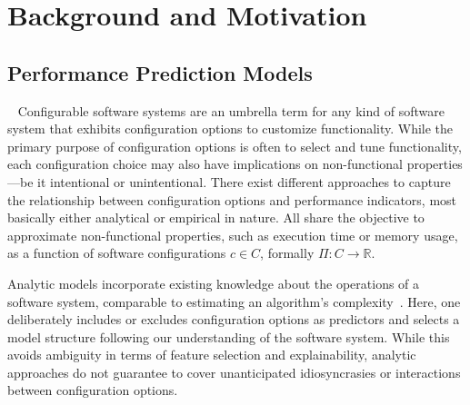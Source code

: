 \section{Background and Motivation}
\subsection{Performance Prediction Models}~\label{sec:perfmodels}
Configurable software systems are an umbrella term for any kind of software system that exhibits configuration options to customize functionality. While the primary purpose of configuration options is often to select and tune functionality, each configuration choice may also have implications on non-functional properties---be it intentional or unintentional. 
There exist different approaches to capture the relationship between configuration options and performance indicators, most basically either analytical or empirical in nature. All share the objective to approximate non-functional properties, such as execution time or memory usage, as a function of software configurations  $c \in C$, formally $\Pi: C \rightarrow \mathbb{R}$. 

Analytic models incorporate existing knowledge about the operations of a software system, comparable to estimating an algorithm’s complexity~\cite{analytic_model_2000,analytic_model_2011}. Here, one deliberately includes or excludes configuration options as predictors and selects a model structure following our understanding of the software system. While this avoids ambiguity in terms of feature selection and explainability, analytic approaches do not guarantee to cover unanticipated idiosyncrasies or interactions between configuration options.

